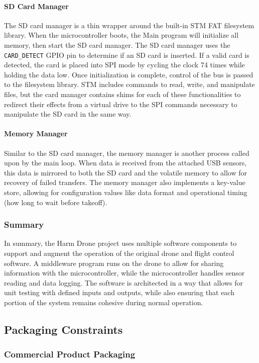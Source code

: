 \documentclass[12pt]{article}
\begin{document}
\paragraph{SD Card Manager} The SD card manager is a thin wrapper around the built-in STM FAT filesystem library. When the microcontroller boots, the Main program will initialize all memory, then start the SD card manager. The SD card manager uses the \verb|CARD_DETECT| GPIO pin to determine if an SD card is inserted. If a valid card is detected, the card is placed into SPI mode by cycling the clock 74 times while holding the data low. Once initialization is complete, control of the bus is passed to the filesystem library. STM includes commands to read, write, and manipulate files, but the card manager contains shims for each of these functionalities to redirect their effects from a virtual drive to the SPI commands necessary to manipulate the SD card in the same way.

\paragraph{Memory Manager} Similar to the SD card manager, the memory manager is another process called upon by the main loop. When data is received from the attached USB sensors, this data is mirrored to both the SD card and the volatile memory to allow for recovery of failed transfers. The memory manager also implements a key-value store, allowing for configuration values like data format and operational timing (how long to wait before takeoff).
\subsubsection{Summary}
In summary, the Harm Drone project uses multiple software components to support and augment the operation of the original drone and flight control software. A middleware program runs on the drone to allow for sharing information with the microcontroller, while the microcontroller handles sensor reading and data logging. The software is architected in a way that allows for unit testing with defined inputs and outputs, while also ensuring that each portion of the system remains cohesive during normal operation.
\subsection{Packaging Constraints}
\subsubsection{Commercial Product Packaging}
\end{document}
